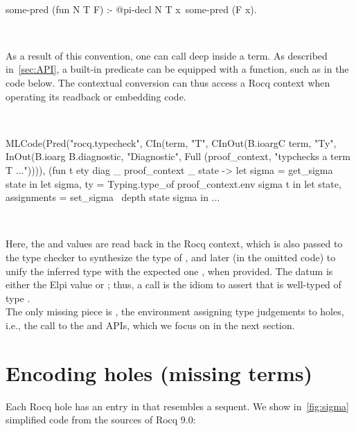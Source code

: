 \documentclass[a4paper, 11pt]{book}
\newenvironment{elpicode}
  {\VerbatimEnvironment~\\\begin{elpibox}\begin{xelpicode}}{\end{xelpicode}
\end{elpibox}\\}
\newenvironment{ocamlcode}
  {\VerbatimEnvironment~\\\begin{ocamlbox}\begin{xocamlcode}}{\end{xocamlcode}
\end{ocamlbox}\\}
\begin{document}
\begin{elpicode}
some-pred (fun N T F) :- @pi-decl N T x\ some-pred (F x).
\end{elpicode}

\noindent
As a result of this convention, one can call  deep inside
a term. As described in~\cref{sec:API}, a built-in predicate can be equipped with a
 function, such as  in the code
below. The  contextual conversion can thus access a Rocq context
when operating its readback or embedding code.

\begin{ocamlcode}
MLCode(Pred("rocq.typecheck",
  CIn(term, "T",
  CInOut(B.ioargC term, "Ty",
  InOut(B.ioarg B.diagnostic, "Diagnostic",
  Full (proof_context, "typchecks a term T ...")))),
    (fun t ety diag _ proof_context _ state ->
      let sigma = get_sigma state in
      let sigma, ty = Typing.type_of proof_context.env sigma t in
      let state, assignments = set_sigma ~depth state sigma in
      ...
\end{ocamlcode}


Here, the  and  values are read back in the
 Rocq context, which is also passed to the type
checker to synthesize the type of , and later (in the omitted code)
to unify the inferred type with the expected one , when provided.
The  datum is either the Elpi value  or
; thus, a call  is the
idiom to assert that  is well-typed of type .
~\\

The only missing piece is , the environment assigning type
judgements to holes, i.e., the call to the  and
 APIs, which we focus on in the next section.

\section{Encoding holes (missing terms)}\label{sec:hoasholes}


Each Rocq hole has an entry in  that resembles a sequent.
We show in~\cref{fig:sigma} simplified code from the sources of Rocq 9.0:
\end{document}

